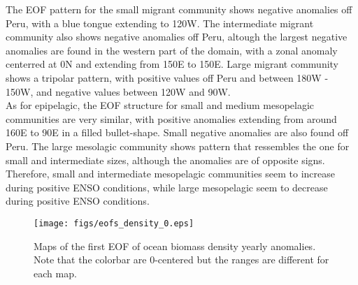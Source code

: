 The EOF pattern for the small migrant community shows negative anomalies off Peru, with a blue tongue extending to 120W. The intermediate migrant community also shows negative anomalies off Peru, altough the largest negative anomalies are found in the western part of the domain, with a zonal anomaly centerred at 0N and extending from 150E to 150E. Large migrant community shows a tripolar pattern, with positive values off Peru and between 180W - 150W, and negative values between 120W and 90W.\\

As for epipelagic, the EOF structure for small and medium mesopelagic communities are very similar, with positive anomalies extending from around 160E to 90E in a filled bullet-shape. Small negative anomalies are also found off Peru. The large mesolagic community shows pattern that ressembles the one for small and intermediate sizes, although the anomalies are of opposite signs. Therefore, small and intermediate mesopelagic communities seem to increase during positive ENSO conditions, while large mesopelagic seem to decrease during positive ENSO conditions.

\begin{figure}
    \centering
    \texttt{[image: figs/eofs\_density\_0.eps]}
    \caption{Maps of the first EOF of ocean biomass density yearly anomalies. Note that the colorbar are 0-centered but the ranges are different for each map.}
    \label{fig:eofmap}
\end{figure}
